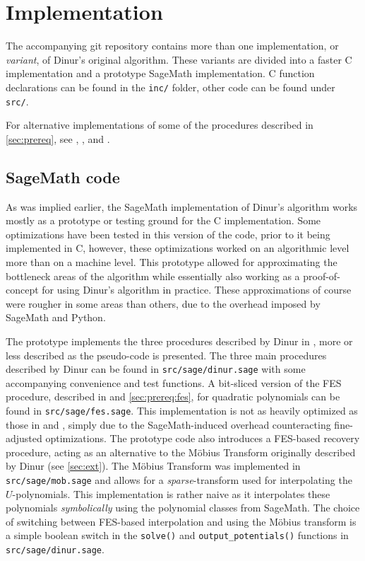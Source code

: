 \section{Implementation} \label{sec:impl}
The accompanying git repository contains more than one implementation, or \textit{variant}, of Dinur's original algorithm. These variants are divided into a faster C implementation and a prototype SageMath implementation. C function declarations can be found in the \texttt{inc/} folder, other code can be found under \texttt{src/}.

For alternative implementations of some of the procedures described in \cref{sec:prereq}, see \cite{ches-2010-23990}, \cite{cryptoeprint:2013/436}, and \cite{crypto-2022-32130}.

\subsection{SageMath code} \label{sec:impl:sage}
As was implied earlier, the SageMath implementation of Dinur's algorithm works mostly as a prototype or testing ground for the C implementation. Some optimizations have been tested in this version of the code, prior to it being implemented in C, however, these optimizations worked on an algorithmic level more than on a machine level.  This prototype allowed for approximating the bottleneck areas of the algorithm while essentially also working as a proof-of-concept for using Dinur's algorithm in practice. These approximations of course were rougher in some areas than others, due to the overhead imposed by SageMath and Python.

The prototype implements the three procedures described by Dinur in \cite{eurocrypt-2021-30841}, more or less described as the pseudo-code is presented. The three main procedures described by Dinur can be found in \texttt{src/sage/dinur.sage} with some accompanying convenience and test functions. A bit-sliced version of the FES procedure, described in \cite{ches-2010-23990} and \cref{sec:prereq:fes}, for quadratic polynomials can be found in \texttt{src/sage/fes.sage}. This implementation is not as heavily optimized as those in \cite{ches-2010-23990} and \cite{cryptoeprint:2013/436}, simply due to the SageMath-induced overhead counteracting fine-adjusted optimizations. The prototype code also introduces a FES-based recovery procedure, acting as an alternative to the Möbius Transform originally described by Dinur (see \cref{sec:ext}). The Möbius Transform was implemented in \texttt{src/sage/mob.sage} and allows for a \textit{sparse}-transform used for interpolating the $U$-polynomials. This implementation is rather naive as it interpolates these polynomials \textit{symbolically} using the polynomial classes from SageMath. The choice of switching between FES-based interpolation and using the Möbius transform is a simple boolean switch in the \texttt{solve()} and \texttt{output\_potentials()} functions in \texttt{src/sage/dinur.sage}.  

